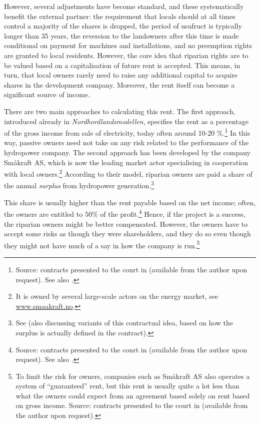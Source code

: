 However, several adjustments have become standard, and these systematically benefit the external partner: the requirement that locals should at all times control a majority of the shares is dropped, the period of usufruct is typically longer than 35 years, the reversion to the landowners after this time is made conditional on payment for machines and installations, and no preemption rights are granted to local residents. However, the core idea that riparian rights are to be valued based on a capitalisation of future rent is accepted. This means, in turn, that local owners rarely need to raise any additional capital to acquire shares in the development company. Moreover, the rent itself can become a significant source of income.

There are two main approaches to calculating this rent. The first approach, introduced already in {\it Nordhordlandsmodellen}, specifies the rent as a percentage of the gross income from sale of electricity, today often around 10-20 \%.\footnote{Source: contracts presented to the court in \cite{sauda09} (available from the author upon request). See also \cite[55-57]{hauge15}.} In this way, passive owners need not take on any risk related to the performance of the hydropower company. The second approach has been developed by the company Småkraft AS, which is now the leading market actor specialising in cooperation with local owners.\footnote{It is owned by several large-scale actors on the energy market, see \url{www.smaakraft.no}.} According to their model, riparian owners are paid a share of the annual {\it surplus} from hydropower generation.\footnote{See \cite[57-60]{hauge15} (also discussing variants of this contractual idea, based on how the surplus is actually defined in the contract).}

This share is usually higher than the rent payable based on the net income; often, the owners are entitled to $50 \%$ of the profit.\footnote{Source: contracts presented to the court in \cite{sauda09} (available from the author upon request). See also \cite[58]{hauge15}.} Hence, if the project is a success, the riparian owners might be better compensated. However, the owners have to accept some risks as though they were shareholders, and they do so even though they might not have much of a say in how the company is run.\footnote{To limit the risk for owners, companies such as Småkraft AS also operates a system of ``guaranteed'' rent, but this rent is usually quite a lot less than what the owners could expect from an agreement based solely on rent based on gross income. Source: contracts presented to the court in \cite{sauda09} (available from the author upon request).}

